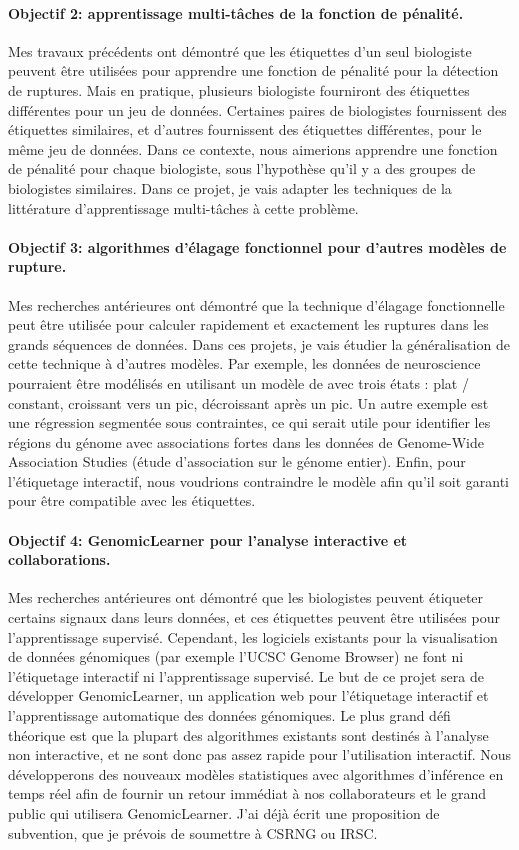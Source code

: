 \documentclass{article}
\begin{document}
\paragraph{Objectif 2: apprentissage multi-tâches de la fonction de
  pénalité.} Mes travaux précédents ont démontré que les étiquettes
d'un seul biologiste peuvent être utilisées pour apprendre une
fonction de pénalité pour la détection de ruptures. Mais en pratique,
plusieurs biologiste fourniront des étiquettes différentes pour un jeu
de données. Certaines paires de biologistes fournissent des étiquettes
similaires, et d'autres fournissent des étiquettes différentes, pour
le même jeu de données. Dans ce contexte, nous aimerions apprendre une
fonction de pénalité pour chaque biologiste, sous l'hypothèse qu'il y
a des groupes de biologistes similaires. Dans ce projet, je vais
adapter les techniques de la littérature d'apprentissage multi-tâches
à cette problème.

\paragraph{Objectif 3: algorithmes d'élagage fonctionnel pour
  d'autres modèles de rupture.} Mes recherches antérieures ont
démontré que la technique d'élagage fonctionnelle peut être utilisée
pour calculer rapidement et exactement les ruptures dans les grands
séquences de données. Dans ces projets, je vais étudier la
généralisation de cette technique à d'autres modèles. Par exemple, les
données de neuroscience pourraient être modélisés en utilisant un
modèle de avec trois états : plat / constant, croissant vers un pic,
décroissant après un pic. Un autre exemple est une régression
segmentée sous contraintes, ce qui serait utile pour identifier les
régions du génome avec associations fortes dans les données de
Genome-Wide Association Studies (étude d'association sur le génome
entier). Enfin, pour l'étiquetage interactif, nous voudrions
contraindre le modèle afin qu'il soit garanti pour être compatible
avec les étiquettes.

\paragraph{Objectif 4: GenomicLearner pour l'analyse interactive et
  collaborations.} Mes recherches antérieures ont démontré que les
biologistes peuvent étiqueter certains signaux dans leurs données, et
ces étiquettes peuvent être utilisées pour l'apprentissage
supervisé. Cependant, les logiciels existants pour la visualisation de
données génomiques (par exemple l'UCSC Genome Browser) ne font ni
l'étiquetage interactif ni l'apprentissage supervisé. Le but de ce
projet sera de développer GenomicLearner, un application web pour
l'étiquetage interactif et l'apprentissage automatique des données
génomiques. Le plus grand défi théorique est que la plupart des
algorithmes existants sont destinés à l'analyse non interactive, et ne
sont donc pas assez rapide pour l'utilisation interactif. Nous
développerons des nouveaux modèles statistiques avec algorithmes
d'inférence en temps réel afin de fournir un retour immédiat à nos
collaborateurs et le grand public qui utilisera GenomicLearner. J'ai
déjà écrit une proposition de subvention, que je prévois de soumettre
à CSRNG ou IRSC.
\end{document}
